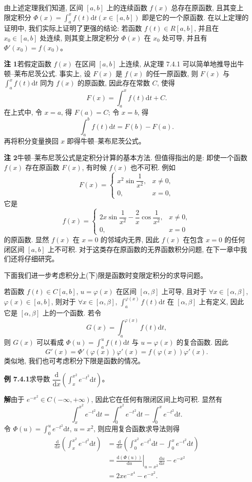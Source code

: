 \documentclass[UTF8,12pt,a4paper,fontset=fandol]{ctexart}
\begin{document}
由上述定理我们知道, 区间 $[a,b]$ 上的连续函数 $f(x)$ 总存在原函数, 且其变上限定积分 $\Phi(x)=\int_a^x f(t)\mathrm dt(x\in[a,b])$ 即是它的一个原函数. 在以上定理的证明中, 我们实际上证明了更强的结论: 若函数 $f(t)\in R[a,b]$, 并且在 $x_0\in[a,b]$ 处连续, 则其变上限定积分 $\Phi(x)$ 在 $x_0$ 处可导, 并且有 $\Phi'(x_0)=f(x_0)$。

\noindent\textbf{注 1}\quad 若假定函数 $f(x)$ 在区间 $[a,b]$ 上连续, 从定理 7.4.1 可以简单地推导出牛顿--莱布尼茨公式. 事实上, 设 $F(x)$ 是 $f(x)$ 的任一原函数, 则 $F(x)$ 与 $\int_a^x f(t)\mathrm dt$ 同为 $f(x)$ 的原函数, 因此存在常数 $C$, 使得
\[
  F(x)=\int_a^x f(t)\mathrm dt+C.
\]
在上式中, 令 $x=a$, 得 $F(a)=C$; 令 $x=b$, 得
\[
  \int_a^b f(t)\mathrm dt=F(b)-F(a).
\]
再将积分变量换回 $x$ 即得牛顿--莱布尼茨公式。

\noindent\textbf{注 2}\quad 牛顿--莱布尼茨公式是定积分计算的基本方法. 但值得指出的是: 即使一个函数 $f(x)$ 存在原函数 $F(x)$, 有时候 $f(x)$ 也不可积. 例如
\[
  F(x)=
  \begin{cases}
    x^2\sin\dfrac{1}{x^2}, & x\neq0,\\
    0, & x=0,
  \end{cases}
\]
它是
\[
  f(x)=
  \begin{cases}
    2x\sin\dfrac{1}{x^2}-\dfrac{2}{x}\cos\dfrac{1}{x^2}, & x\neq0,\\
    0, & x=0
  \end{cases}
\]
的原函数. 显然 $f(x)$ 在 $x=0$ 的邻域内无界, 因此 $f(x)$ 在包含 $x=0$ 的任何闭区间 $[a,b]$ 上不可积. 对于这类存在原函数的无界函数积分问题, 在下一章中我们还将仔细研究。

下面我们进一步考虑积分上(下)限是函数时变限定积分的求导问题。

若函数 $f(t)\in C[a,b]$, $u=\varphi(x)$ 在区间 $[\alpha,\beta]$ 上可导, 且对于 $\forall x\in[\alpha,\beta]$, $\varphi(x)\in[a,b]$, 则对于 $\forall x\in[\alpha,\beta]$, $\int_a^{\varphi(x)} f(t)\mathrm dt$ 在 $[\alpha,\beta]$ 上有定义, 因此它是 $[\alpha,\beta]$ 上的一个函数. 若令
\[
  G(x)=\int_a^{\varphi(x)} f(t)\mathrm dt,
\]
则 $G(x)$ 可以看成 $\Phi(u)=\int_a^u f(t)\mathrm dt$ 与 $u=\varphi(x)$ 的复合函数. 因此
\[
  G'(x)=\Phi'(\varphi(x))\varphi'(x)=f(\varphi(x))\varphi'(x).
\]
类似地, 我们也可考虑积分下限是函数的情况。

\noindent\textbf{例 7.4.1}\quad 求导数 $\dfrac{\mathrm d}{\mathrm dx}\left(\int_x^{x^2} e^{-t^2}\mathrm dt\right)$。

\noindent\textbf{解}\quad 由于 $e^{-x^2}\in C(-\infty,+\infty)$, 因此它在任何有限闭区间上均可积. 显然有
\[
  \int_x^{x^2} e^{-t^2}\mathrm dt=\int_0^{x^2} e^{-t^2}\mathrm dt-\int_0^x e^{-t^2}\mathrm dt.
\]
令 $\Phi(u)=\int_0^u e^{-t^2}\mathrm dt$, $u=x^2$, 则应用复合函数求导法则得
\[
\begin{aligned}
  \frac{\mathrm d}{\mathrm dx}\left(\int_x^{x^2} e^{-t^2}\mathrm dt\right)
  &=\frac{\mathrm d}{\mathrm dx}\left(\int_0^{x^2} e^{-t^2}\mathrm dt-\int_0^x e^{-t^2}\mathrm dt\right)\\
  &=\left.\frac{\mathrm d(\Phi(u))}{\mathrm du}\right|_{u=x^2}\frac{\mathrm du}{\mathrm dx}-e^{-x^2}\\
  &=2xe^{-x^4}-e^{-x^2}.
\end{aligned}
\]
\end{document}
